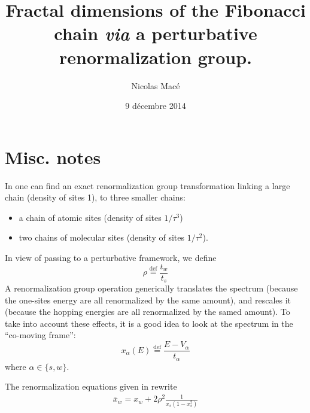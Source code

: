 \documentclass[11pt]{article}
\title{\textbf{Fractal dimensions of the Fibonacci chain \emph{via} a perturbative renormalization group.}}
\author{Nicolas Macé}
\date{9 décembre 2014}
\newcommand{\define}{\ensuremath{ \overset{\text{def}}{=} }}
\begin{document}

\maketitle

\section{Misc. notes}

In \cite{Zhong1991} one can find an exact renormalization group transformation linking a large chain (density of sites 1), to three smaller chains:
\begin{itemize}
	\item a chain of atomic sites (density of sites $1/\tau^3$)
	\item two chains of molecular sites (density of sites $1/\tau^2$).
\end{itemize}

In view of passing to a perturbative framework, we define
\begin{equation}
	\rho \define \frac{t_w}{t_s}
\end{equation}
A renormalization group operation generically translates the spectrum (because the one-sites energy are all renormalized by the same amount), and rescales it (because the hopping energies are all renormalized by the samed amount).
To take into account these effects, it is a good idea to look at the spectrum in the ``co-moving frame'':
\begin{equation}
	x_{\alpha}(E) \define \frac{E - V_{\alpha}}{t_{\alpha}}
\end{equation}
where $\alpha \in \{ s, w \}$.

The renormalization equations given in \cite{Zhong1991} rewrite
\begin{align}
	\bar{x}_w = x_w + 2 \rho^2 \frac{1}{x_s(1-x_s^2)}
\end{align}

{}

\end{document}
